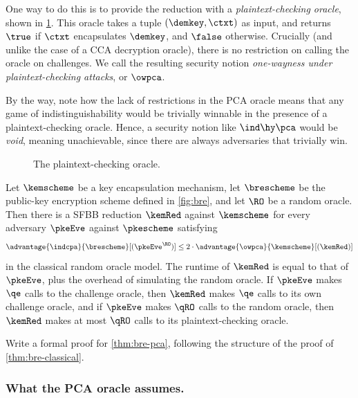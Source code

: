     One way to do this is to provide the reduction with a
      \emph{plaintext-checking oracle}, shown in \cref{fig:pca}. This oracle
      takes a tuple $(\demkey, \ctxt)$ as input, and returns $\true$ if $\ctxt$
      encapsulates $\demkey$, and $\false$ otherwise. Crucially (and unlike
      the case of a CCA decryption oracle), there is no restriction on calling the
      oracle on challenges. We call the resulting security notion \emph{one-wayness
      under plaintext-checking attacks}, or $\owpca$.

    By the way, note how the lack of restrictions in the PCA oracle means that
      any game of indistinguishability would be trivially winnable in the
      presence of a plaintext-checking oracle. Hence, a security notion like
      $\ind\hy\pca$ would be \emph{void}, meaning unachievable, since there are
      always adversaries that trivially win.

    \begin{figure}[t]
      \centering
      \begin{pchstack}[center]
        \procedure{$\Ocheck(\demkey, \ctxt)$}{
          \pcreturn \kemdec_\sk(\ctxt) = \demkey
        }
      \end{pchstack}
    \caption{
      \label{fig:pca}
      The plaintext-checking oracle.
    }
    \end{figure}

    \begin{theorem}\label{thm:bre-pca}
      Let $\kemscheme$ be a key encapsulation mechanism, let $\brescheme$ be the
      public-key encryption scheme defined in \cref{fig:bre}, and let $\RO$ be a random oracle. 
      Then there is a SFBB reduction $\kemRed$ against $\kemscheme$ 
      for every adversary $\pkeEve$ against $\pkescheme$ satisfying
      \[
        \advantage{\indcpa}{\brescheme}[(\pkeEve^{\RO})]
        \leq 2\cdot \advantage{\owpca}{\kemscheme}[(\kemRed)]
      \]
      in the classical random oracle model. The runtime of $\kemRed$ is equal
      to that of $\pkeEve$, plus the overhead of simulating the random oracle. 
      If $\pkeEve$ makes $\qe$ calls to the challenge
      oracle, then $\kemRed$ makes $\qe$ calls to its own challenge oracle,
      and if $\pkeEve$ makes $\qRO$ calls to the random oracle, then $\kemRed$
      makes at most $\qRO$ calls to its plaintext-checking oracle.
    \end{theorem}
    \let\pkeEve\undefined
    \let\kemRed\undefined

    \begin{exercise}
      Write a formal proof for \cref{thm:bre-pca}, following the structure of
      the proof of \cref{thm:bre-classical}.
    \end{exercise}

  \subsubsection{What the PCA oracle assumes.}

